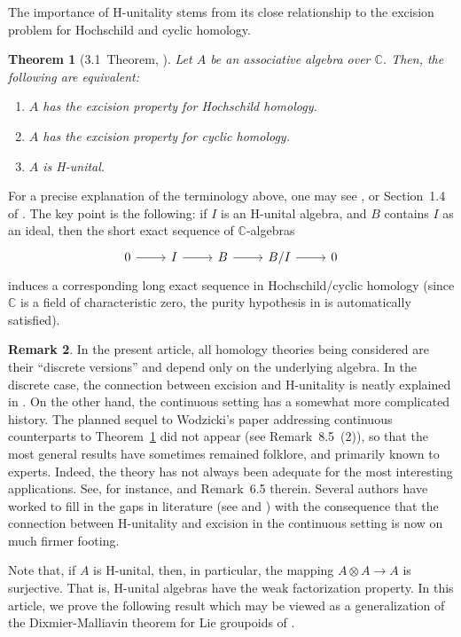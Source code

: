 \documentclass[12pt]{article}
\theoremstyle{plain}
\newtheorem{thm}{Theorem}[section]
\theoremstyle{definition}
\newtheorem{rmk}[thm]{Remark}
\newcommand{\C}{\mathbb{C}}
\numberwithin{equation}{section}
\begin{document}
The importance of H-unitality stems from its close relationship to the excision problem for Hochschild and cyclic homology.


\begin{thm}[3.1~Theorem, \cite{Wodzicki}]\label{wod}
Let $A$ be an associative algebra over $\C$. Then, the following are equivalent:
\begin{enumerate}
\item $A$ has the excision property for Hochschild homology.
\item $A$ has the excision property for cyclic homology.
\item $A$ is H-unital.
\end{enumerate}
\end{thm}

For a precise explanation of the terminology above, one may see  \cite{Wodzicki}, or Section~1.4 of \cite{Loday}. The key point  is the following: if $I$ is an H-unital algebra, and $B$ contains $I$ as an ideal, then  the short exact sequence of $\C$-algebras
\[ \begin{tikzcd} 
0 \ar[r] & I  \ar[r] & B \ar[r] & B/I \ar[r] & 0
\end{tikzcd} \]
induces  a corresponding long exact sequence in Hochschild/cyclic homology (since $\C$ is a field of characteristic zero, the purity hypothesis in \cite{Wodzicki} is automatically satisfied).

 
\begin{rmk}
In the present article, all homology theories being considered are  their ``discrete versions'' and  depend only on the underlying algebra. In the discrete case,  the connection between excision and H-unitality is neatly explained in  \cite{Wodzicki}.  On the other hand, the continuous setting has a somewhat more complicated history. The  planned sequel to Wodzicki's paper addressing continuous counterparts to Theorem~\ref{wod} did not appear  (see Remark~8.5~(2)), so that the most general results have sometimes remained folklore, and primarily known to experts. Indeed, the theory has not always been adequate for the most interesting applications. See, for instance,  \cite{Brasselet-Pflaum} and Remark~6.5 therein. Several authors have worked to fill in the gaps in literature (see \cite{Guccione} and \cite{Meyer}) with the consequence that the connection between H-unitality and excision in the continuous setting is now on much firmer footing.
\end{rmk} 


Note that, if $A$ is H-unital, then, in particular, the mapping $A\otimes A \to A$ is surjective. That is, H-unital algebras have the weak factorization property. In this article, we prove the following result which may be viewed as a generalization of the Dixmier-Malliavin theorem for Lie groupoids of \cite{Francis[DM]}.
\end{document}
